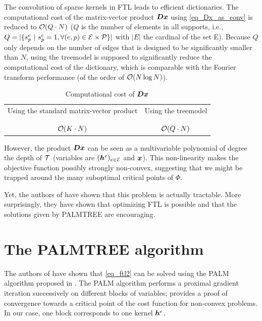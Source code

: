 The convolution of sparse kernels in \ac{FTL} leads to efficient dictionaries. The computational cost of the matrix-vector product $\bm{D}\bm{x}$ using \cref{eq_Dx_as_conv} is reduced to $\mathcal{O}(Q \cdot N)$ ($Q$ is the number of elements in all supports, i.e., $Q=|\{s^e_p ~|~ s^e_p = 1, \forall (e,p) \in \mathcal E \times \mathcal P\}|$ with $|E|$ the cardinal of the set E). Because $Q$ only depends on the number of edges that is designed to be significantly smaller than  $N$, using the \gls{treemodel} is supposed to significantly reduce the computational cost of the dictionary, which is comparable with the Fourier transform performance (of the order of $\mathcal{O}(N \log N)$).

\begin{table}[!ht] \centering 
\caption{Computational cost of $\bm{D}\bm{x}$}\label{table_comparison_Dx_costs}
\begin{tabular}{c|c}
Using the standard matrix-vector product & Using the \gls{treemodel} \\\\ \hline \\
$\mathcal{O}(K \cdot N)$ & $\mathcal{O}(Q \cdot N)$
\end{tabular}
\end{table}


\noindent
However, the product $\bm{D}\bm{x}$ can be seen as a multivariable polynomial of degree the depth of $\mathcal T$ (variables are $(\bm{h}^e)_{e \in \mathcal E}$ and $\bm{x}$). This non-linearity makes the objective function possibly strongly non-convex, suggesting that we might be trapped around the many suboptimal critical points of $\Phi$.

\noindent
Yet, the authors of \cite{chabiron_optimization_2016} have shown that this problem is actually tractable. More surprisingly, they have shown that optimizing \ac{FTL} is possible and that the solutions given by \acs{PALMTREE} are encouraging.


\section{The PALMTREE algorithm}\label{sec_palmtree}

The authors of \cite{chabiron_optimization_2016} have shown that \eqref{eq_ftl2} can be solved using the \ac{PALM} algorithm proposed in \cite{bolte_proximal_2014}. The \ac{PALM} algorithm performs a proximal gradient iteration successively on different blocks of variables; \cite{bolte_proximal_2014} provides a proof of convergence towards a critical point of the cost function for non-convex problems. In our case, one block corresponds to one kernel $\bm{h}^e$.


